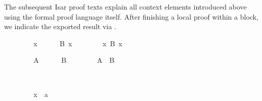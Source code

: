 \begin{isabellebody}
\begin{isamarkuptext}
  \medskip The subsequent Isar proof texts explain all context
  elements introduced above using the formal proof language itself.
  After finishing a local proof within a block, we indicate the
  exported result via \hyperlink{command.note}{\mbox{}}.%
\end{isamarkuptext}%
\isamarkuptrue%
%
\isadelimproof
%
\endisadelimproof
%
\isatagproof
%
\begin{minipage}[t]{0.45\textwidth}
\ \ \isamarkupfalse%
\isanewline
\ \ \ \ \isamarkupfalse%
\ x\isanewline
\ \ \ \ \isamarkupfalse%
\ {}B\ x{}%
\endisatagproof
{\isafoldproof}%
%
\isadelimproof
%
\endisadelimproof
%
\isadelimnoproof
\ %
\endisadelimnoproof
%
\isatagnoproof
{}\isamarkupfalse%
%
\endisatagnoproof
{\isafoldnoproof}%
%
\isadelimnoproof
\isanewline
%
\endisadelimnoproof
%
\isadelimproof
\ \ %
\endisadelimproof
%
\isatagproof
{}\isamarkupfalse%
\isanewline
\ \ \isamarkupfalse%
\ {}{}x{}\ B\ x{}%
\end{minipage}\quad\begin{minipage}[t]{0.45\textwidth}
\ \ \isamarkupfalse%
\isanewline
\ \ \ \ \isamarkupfalse%
\ A\isanewline
\ \ \ \ \isamarkupfalse%
\ B%
\endisatagproof
{\isafoldproof}%
%
\isadelimproof
%
\endisadelimproof
%
\isadelimnoproof
\ %
\endisadelimnoproof
%
\isatagnoproof
{}\isamarkupfalse%
%
\endisatagnoproof
{\isafoldnoproof}%
%
\isadelimnoproof
\isanewline
%
\endisadelimnoproof
%
\isadelimproof
\ \ %
\endisadelimproof
%
\isatagproof
{}\isamarkupfalse%
\isanewline
\ \ \isamarkupfalse%
\ {}A\ {}\ B{}%
\end{minipage}\\[3ex]\begin{minipage}[t]{0.45\textwidth}
\ \ \isamarkupfalse%
\isanewline
\ \ \ \ \isamarkupfalse%
\ x\ {}\ a\isanewline

\end{minipage}
\end{isabellebody}
